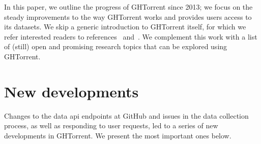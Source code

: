 \documentclass{sig-alternate}
\begin{document}
In this paper, we outline the progress of GHTorrent since 2013; we focus on the
steady improvements to the way GHTorrent works and provides users
access to its datasets. We skip a generic introduction to GHTorrent itself, for
which we refer interested readers to references~\cite{GS12} and~\cite{Gousi13}.
We complement this work with a list of (still) open and promising research
topics that can be explored using GHTorrent.

\section{New developments}

Changes to the data {\sc api} endpoints at GitHub and issues in the data collection
process, as well as responding to user requests, led to a series of new
developments in GHTorrent. We present the most important ones below.
\end{document}
